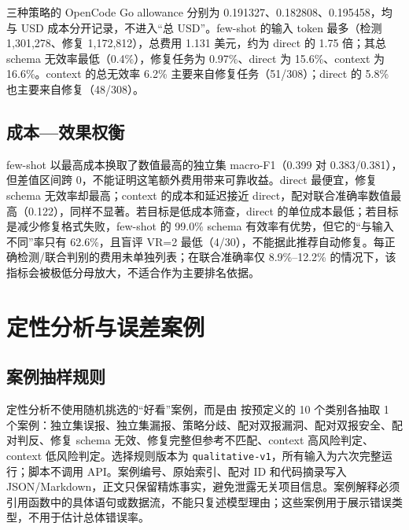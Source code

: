 \documentclass[conference]{IEEEtran}
\begin{document}
三种策略的 OpenCode Go allowance 分别为 0.191327、0.182808、0.195458，均与 USD 成本分开记录，不进入“总 USD”。few-shot 的输入 token 最多（检测 1{,}301{,}278、修复 1{,}172{,}812），总费用 1.131 美元，约为 direct 的 1.75 倍；其总 schema 无效率最低（0.4\%），修复任务为 0.97\%、direct 为 15.6\%、context 为 16.6\%。context 的总无效率 6.2\% 主要来自修复任务（51/308）；direct 的 5.8\% 也主要来自修复（48/308）。

\subsection{成本—效果权衡}
few-shot 以最高成本换取了数值最高的独立集 macro-F1（0.399 对 0.383/0.381），但差值区间跨 0，不能证明这笔额外费用带来可靠收益。direct 最便宜，修复 schema 无效率却最高；context 的成本和延迟接近 direct，配对联合准确率数值最高（0.122），同样不显著。若目标是低成本筛查，direct 的单位成本最低；若目标是减少修复格式失败，few-shot 的 99.0\% schema 有效率有优势，但它的“与输入不同”率只有 62.6\%，且盲评 VR=2 最低（4/30），不能据此推荐自动修复。每正确检测/联合判别的费用未单独列表；在联合准确率仅 8.9\%--12.2\% 的情况下，该指标会被极低分母放大，不适合作为主要排名依据。

\section{定性分析与误差案例}
\label{sec:qualitative}

\subsection{案例抽样规则}
定性分析不使用随机挑选的“好看”案例，而是由  按预定义的 10 个类别各抽取 1 个案例：独立集误报、独立集漏报、策略分歧、配对双报漏洞、配对双报安全、配对判反、修复 schema 无效、修复完整但参考不匹配、context 高风险判定、context 低风险判定。选择规则版本为 \texttt{qualitative-v1}，所有输入为六次完整运行；脚本不调用 API。案例编号、原始索引、配对 ID 和代码摘录写入 JSON/Markdown，正文只保留精炼事实，避免泄露无关项目信息。案例解释必须引用函数中的具体语句或数据流，不能只复述模型理由；这些案例用于展示错误类型，不用于估计总体错误率。
\end{document}
